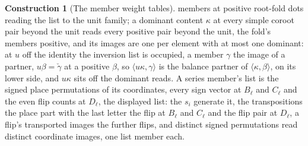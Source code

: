\documentclass[11pt]{article}
\theoremstyle{definition}
\newtheorem{construction}{Construction}
\begin{document}
\begin{construction}[The member weight tables]
members at positive root-fold dots reading the list to the unit
family; a dominant content $\kappa$ at every simple coroot pair
beyond the unit reads every positive pair beyond the unit, the
fold's members positive, and its images are one per element with
at most one dominant: at $u$ off the identity the inversion list
is occupied, a member $\gamma$ the image of a partner,
$u\beta=\check\gamma$ at a positive $\beta$, so
$\langle u\kappa,\gamma\rangle$ is the balance partner of
$\langle\kappa,\beta\rangle$, on its lower side, and $u\kappa$
sits off the dominant reads. A series member's list is the signed place
permutations of its coordinates, every sign vector at $B_\ell$
and $C_\ell$ and the even flip counts at $D_\ell$, the displayed
list: the $s_i$ generate it, the transpositions the place part
with the last letter the flip at $B_\ell$ and $C_\ell$ and the
flip pair at $D_\ell$, a flip's transported images the further flips,
and distinct signed permutations read distinct coordinate
images, one list member each.


\end{construction}
\end{document}
